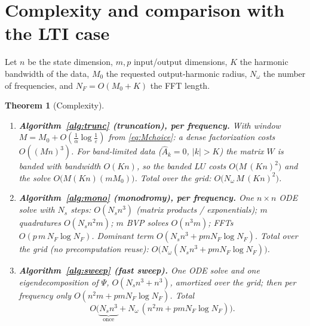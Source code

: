 \documentclass{amsart}
\newtheorem{theorem}{Theorem}
\theoremstyle{definition}
\begin{document}
\section{Complexity and comparison with the LTI case}\label{sec:complexity}

Let $n$ be the state dimension, $m,p$ input/output dimensions, $K$ the harmonic
bandwidth of the data, $M_0$ the requested output-harmonic radius,
$N_\omega$ the number of frequencies, and $N_F=O(M_0+K)$ the FFT length.

\begin{theorem}[Complexity]\label{thm:complexity}
\leavevmode
\begin{enumerate}
\item \textbf{Algorithm~\ref{alg:trunc} (truncation), per frequency.} With
window $M=M_0+O(\tfrac1\alpha\log\tfrac1\varepsilon)$ from \eqref{eq:Mchoice}: a
dense factorization costs $O((Mn)^3)$. For band-limited data ($\hat A_k=0$,
$|k|>K$) the matrix $W$ is banded with bandwidth $O(Kn)$, so the banded
$LU$ costs $O\!\big(M\,(Kn)^2\big)$ and the solve $O\!\big(M (Kn) (mM_0)\big)$.
Total over the grid: $O\!\big(N_\omega\,M\,(Kn)^2\big)$.
\item \textbf{Algorithm~\ref{alg:mono} (monodromy), per frequency.} One
$n\times n$ ODE solve with $N_s$ steps: $O(N_s n^3)$ (matrix products /
exponentials); $m$ quadratures $O(N_s n^2 m)$; $m$ BVP solves $O(n^3 m)$; FFTs
$O(p\,m\,N_F\log N_F)$. Dominant term $O(N_s n^3 + p m N_F\log N_F)$. Total over
the grid (no precomputation reuse): $O\!\big(N_\omega(N_s n^3+pmN_F\log N_F)\big)$.
\item \textbf{Algorithm~\ref{alg:sweep} (fast sweep).} \emph{One} ODE solve and
\emph{one} eigendecomposition of $\Psi$, $O(N_s n^3+n^3)$, amortized over the
grid; then per frequency only $O(n^2 m + pmN_F\log N_F)$. Total
\begin{equation}\label{eq:sweepcost}
O\!\big(\underbrace{N_s n^3}_{\text{once}}+N_\omega\,(n^2 m+p m N_F\log N_F)\big).
\end{equation}
\end{enumerate}
\end{theorem}
\end{document}

